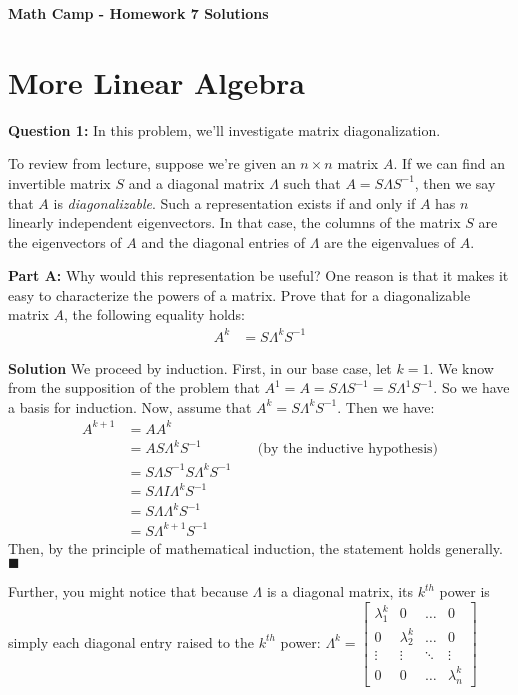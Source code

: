 \documentclass[10pt]{amsart}
\begin{document}
\centerline{\bf Math Camp - Homework 7 Solutions}


\section{More Linear Algebra}

\textbf{Question 1:} In this problem, we'll investigate matrix diagonalization. 

To review from lecture, suppose we're given an $n \times n$ matrix $A$. If we can find an invertible matrix $S$ and a diagonal matrix $\Lambda$ such that $A = S\Lambda S^{-1}$, then we say that $A$ is {\it diagonalizable}. Such a representation exists if and only if  $A$ has $n$ linearly independent eigenvectors. In that case, the columns of the matrix $S$ are the eigenvectors of $A$ and the diagonal entries of $\Lambda$ are the eigenvalues of $A$. 

\textbf{Part A:} Why would this representation be useful? One reason is that it makes it easy to characterize the powers of a matrix. Prove that for a diagonalizable matrix $A$, the following equality holds:
\begin{align*}
A^k &= S \Lambda^k S^{-1}
\end{align*}

\textbf{Solution}
We proceed by induction. First, in our base case, let $k=1$. We know from the supposition of the problem that $A^1 = A = S  \Lambda S^{-1} = S \Lambda^1 S^{-1}$. So we have a basis for induction. Now, assume that $A^k = S \Lambda^k S^{-1}$. Then we have:
\begin{align*}
A^{k+1} &= A A^k  \\
&= A S \Lambda^k S^{-1} \quad\quad\quad\quad\text{(by the inductive hypothesis)} \\
&= S \Lambda S^{-1} S \Lambda^k S^{-1} \\
&= S \Lambda I \Lambda^k S^{-1} \\
&= S \Lambda \Lambda^k S^{-1} \\
&= S \Lambda^{k+1} S^{-1} 
\end{align*}
Then, by the principle of mathematical induction, the statement holds generally. $\blacksquare$

Further, you might notice that because $\Lambda$ is a diagonal matrix, its $k^{th}$ power is simply each diagonal entry raised to the $k^{th}$ power: $\Lambda^k = \left[\begin{matrix}
\lambda_1^k & 0 & \dots & 0 \\
0 & \lambda_2^k & \dots & 0 \\
\vdots & \vdots & \ddots & \vdots \\
0 & 0 & \dots & \lambda_n^k
\end{matrix}\right]$
\end{document}
